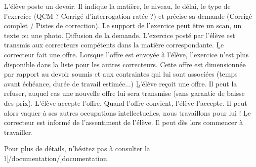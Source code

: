 \begin{enumerate}
\li \b{L'élève poste un devoir}. Il indique la matière, le niveau, le délai, le type de l'exercice (QCM ? Corrigé d'interrogation ratée ?) et précise sa demande (Corrigé complet / Pistes de correction). Le support de l'exercice peut être un scan, un texte ou une photo.
\li \b{Diffusion de la demande}. L'exercice posté par l'élève est transmis aux correcteurs compétents dans la matière correspondante.
\li \b{Le correcteur fait une offre}.  Lorsque l'offre est envoyée à l'élève, l'exercice n'est plus disponible dans la liste pour les autres correcteurs. Cette offre est dimensionnée par rapport au devoir soumis et aux contraintes qui lui sont associées (temps avant échéance, durée de travail estimée...)
\li \b{L'élève reçoit une offre}. Il peut la refuser, auquel cas une nouvelle offre lui sera transmise (sans garantie de baisse des prix).
\li \b{L'élève accepte l'offre}. Quand l'offre convient, l'élève l'accepte. Il peut alors vaquer à ses autres occupations intellectuelles, nous travaillons pour lui !
\li \b{Le correcteur est informé de l'assentiment de l'élève}. Il peut dès lors commencer à travailler.
\end{enumerate}

Pour plus de détails, n'hésitez pas à consulter la \l[/documentation/]{documentation}.